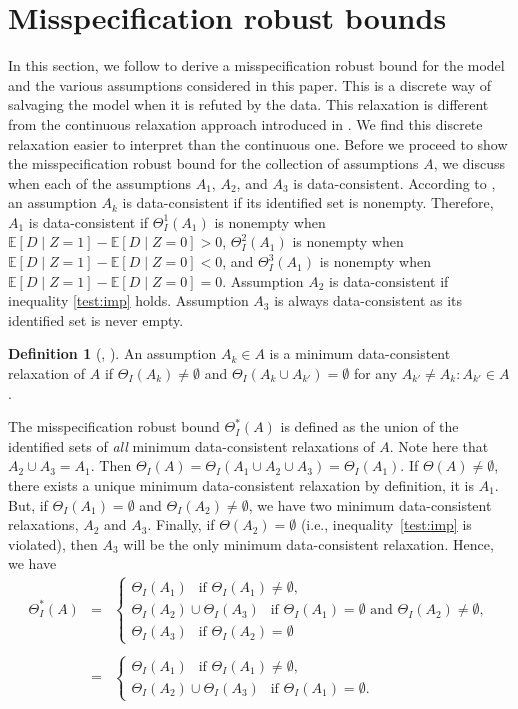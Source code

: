 \documentclass[12pt]{article}
\theoremstyle{plain}
\theoremstyle{definition}
\newtheorem{definition}{Definition}%
\theoremstyle{remark}
\begin{document}
\section{Misspecification robust bounds}\label{sec:mrb}
In this section, we follow \cite{li2024discordant} to derive a misspecification robust bound for the model and the various assumptions considered in this paper. This is a discrete way of salvaging the model when it is refuted by the data. This relaxation is different from the continuous relaxation approach introduced in \cite{Masten2021SalvagingModels}. We find this discrete relaxation easier to interpret than the continuous one. Before we proceed to show the misspecification robust bound for the collection of assumptions $A$, we discuss when each of the assumptions $A_1$, $A_2$, and $A_3$ is data-consistent. According to \cite{li2024discordant}, an assumption $A_k$ is data-consistent if its identified set is nonempty. Therefore, $A_1$ is data-consistent if $\Theta_I^1(A_1)$ is nonempty when $\mathbb E[D\mid Z=1]-\mathbb E[D\mid Z=0]>0$, $\Theta_I^2(A_1)$ is nonempty when $\mathbb E[D\mid Z=1]-\mathbb E[D\mid Z=0]<0$, and $\Theta_I^3(A_1)$ is nonempty when $\mathbb E[D\mid Z=1]-\mathbb E[D\mid Z=0]=0$. Assumption $A_2$ is data-consistent if inequality \eqref{test:imp} holds. Assumption $A_3$ is always data-consistent as its identified set is never empty. 
\begin{definition}[\citeauthor{li2024discordant}, \citeyear{li2024discordant}]
An assumption $A_k\in A$ is a minimum data-consistent relaxation of $A$ if $\Theta_I(A_k)\neq \emptyset$ and $\Theta_I(A_k\cup A_{k'})=\emptyset$ for any $A_{k'} \neq A_k: A_{k'} \in A$. 
\end{definition}
The misspecification robust bound $\Theta_I^*(A)$ is defined as the union of the identified sets of \textit{all} minimum data-consistent relaxations of $A$. Note here that $A_2 \cup A_3=A_1$. Then $\Theta_I(A)=\Theta_I(A_1\cup A_2\cup A_3)=\Theta_I(A_1).$ If $\Theta(A)\neq \emptyset$, there exists a unique minimum data-consistent relaxation by definition, it is $A_1$. But, if $\Theta_I(A_1)=\emptyset$ and $\Theta_I(A_2)\neq \emptyset$, we have two minimum data-consistent relaxations, $A_2$ and $A_3$. Finally, if $\Theta(A_2)=\emptyset$ (i.e., inequality~\eqref{test:imp} is violated), then $A_3$ will be the only minimum data-consistent relaxation. Hence, we have
\begin{eqnarray*}
\Theta_I^{*}(A)&=&\left\{\begin{array}{l}
       \Theta_I(A_1)\ \ \text{ if } \Theta_I(A_1)\neq \emptyset,\\
\Theta_I(A_{2})\cup\Theta_I(A_{3})\ \ \text{ if } \Theta_I(A_1) = \emptyset \text{ and } \Theta_I(A_2) \neq \emptyset,\\
\Theta_I(A_3)\ \ \text{ if } \Theta_I(A_2) = \emptyset
        \end{array}\right.\\ \\
&=&\left\{\begin{array}{l}
\Theta_I(A_1)\ \ \text{ if } \Theta_I(A_1)\neq \emptyset,\\
\Theta_I(A_{2})\cup \Theta_I(A_{3})\ \ \text{ if } \Theta_I(A_1) = \emptyset.
\end{array}\right.
\end{eqnarray*}
\end{document}
